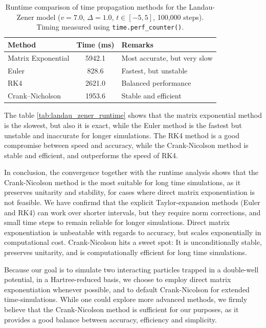 \documentclass{subfiles}
\begin{document}
\begin{table}[h!]
\centering
\caption{Runtime comparison of time propagation methods for the Landau-Zener model ($v = 7.0$, $\Delta = 1.0$, $t \in [-5, 5]$, 100,000 steps). Timing measured using \texttt{time.perf\_counter()}.}
\begin{tabular}{l c l}
\toprule
\textbf{Method} & \textbf{Time (ms)} & \textbf{Remarks} \\
\midrule
Matrix Exponential & 5942.1 & Most accurate, but very slow \\
Euler              & 828.6  & Fastest, but unstable \\
RK4                & 2621.0 & Balanced performance \\
Crank--Nicholson   & 1953.6 & Stable and efficient \\
\bottomrule
\end{tabular}\label{tab:landau_zener_runtime}
\end{table}
The table \eqref{tab:landau_zener_runtime} shows that the matrix exponential method is the slowest, but also it is exact, while the Euler method is the fastest but unstable and inaccurate for longer simulations. The RK4 method is a good compromise between speed and accuracy, while the Crank-Nicolson method is stable and efficient, and outperforms the speed of RK4. 

In conclusion, the convergence together with the runtime analysis shows that the Crank-Nicolson method is the most suitable for long time simulations, as it preserves unitarity and stability, for cases where direct matrix exponentiation is not feasible. We have confirmd that the explicit Taylor-expansion methods (Euler and RK4) can work over shorter intervals, but they require norm corrections, and small time steps to remain reliable for longer simulations. Direct matrix exponentiation is unbeatable with regards to accuracy, but scales exponentially in computational cost. Crank-Nicolson hits a sweet spot: It is unconditionally stable, preserves unitarity, and is computationally efficient for long time simulations. 

Because our goal is to simulate two interacting particles trapped in a double-well potential, in a Hartree-reduced basis, we choose to employ direct matrix exponentiation whenever possible, and to default Crank-Nicolson for extended time-simulations. While one could explore more advanced methods, we firmly believe that the Crank-Nicolson method is sufficient for our purposes, as it provides a good balance between accuracy, efficiency and simplicity.
\end{document}
